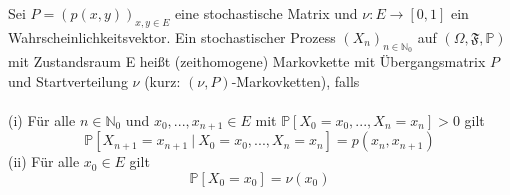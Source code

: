 \label{zeithomogene Markovkette}
Sei  $P =(p(x,y))_{x,y \in E}$ eine stochastische Matrix und $\nu: E \to [0,1]$ ein Wahrscheinlichkeitsvektor. Ein stochastischer Prozess $(X_{n})_{n \in \mathbb{N}_{0}}$ auf $(\Omega, \mathfrak{F}, \mathbb{P})$ mit Zustandsraum E heißt (zeithomogene) Markovkette mit Übergangsmatrix $P$ und Startverteilung $\nu$ (kurz: $(\nu,P)$-Markovketten), falls
\\
\\
(i) Für alle $n \in \mathbb{N}_{0}$ und $x_{0},...,x_{n+1} \in E$ mit $\mathbb{P}[X_{0} = x_{0},...,X_{n} = x_{n}]>0$ gilt
\begin{equation*}
\mathbb{P}[X_{n+1} = x_{n+1} \: | \: X_{0} = x_{0},...,X_{n} = x_{n}] = p(x_{n},x_{n+1})
\end{equation*}
(ii) Für alle $x_{0} \in E$ gilt
\begin{equation*}
\mathbb{P}[X_{0} = x_{0}]  = \nu(x_{0})
\end{equation*}